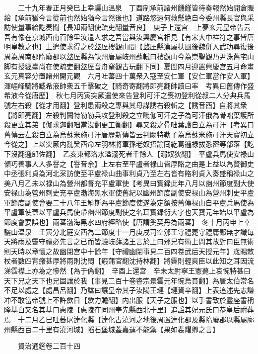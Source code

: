 　　二十九年春正月癸巳上幸驪山温泉　丁酉制承前諸州饑饉皆待奏報然始開倉賑給【承前猶今言從前也然始猶今言然後也】道路悠遠何救懸絶自今委州縣長官與采訪使量事給訖奏聞【長知兩翻使疏吏翻量音良】　庚子上還宫　上夢玄元皇帝告云吾有像在京城西南百餘里汝遣人求之吾當與汝興慶宫相見【有宋大中祥符之事皆唐明皇教之也】上遣使求得之於盩厔樓觀山間【盩厔縣漢屬扶風後魏併入武功尋復後周為周南郡隋廢郡以盩厔縣為缺州唐屬岐州蘇軾曰樓觀山今為崇聖觀乃尹洙舊宅山脚有授經臺尚在使疏吏翻盩厔音舟窒觀古玩翻下同】夏閏四月迎置興慶宫五月命畫玄元真容分置諸州開元觀　六月吐蕃四十萬衆入寇至安仁軍【安仁軍當作安人軍】渾崕峰騎將臧希液帥衆五千擊破之【騎奇寄翻將即亮翻帥讀曰率　考異曰舊傳作盛希液今從唐歷】　秋七月丙寅突厥遣使來告登利可汗之喪初登利從叔二人分典兵馬號左右殺【從才用翻】登利患兩殺之專與其母謀誘右殺斬之【誘音酉】自將其衆【將即亮翻】左殺判闕特勒勒兵攻登利殺之立毗伽可汗之子為可汗俄為骨咄葉護所殺更立其弟【伽求迦翻咄當沒翻更工衡翻】尋又殺之骨咄葉護自立為可汗【考異曰舊傳云左殺自立為烏蘇米施可汗唐歷新傳皆云判闕特勒子為烏蘇米施可汗天寶初立今從之】上以突厥内亂癸酉命左羽林將軍孫老奴招諭囘紇葛邏禄拔悉密等部落【訖下沒翻邏郎佐翻】　乙亥東都洛水溢溺死者千餘人【溺奴狄翻】　平盧兵馬使安禄山傾巧善事人人多譽之【譽音余】上左右至平盧者禄山皆厚賂之由是上益以為賢御史中丞張利貞為河北采訪使至平盧禄山曲事利貞乃至左右皆有賂利貞入奏盛稱禄山之美八月乙未以禄山為營州都督充平盧軍使【考異曰實録此年八月以幽州節度副大使安禄山為營州刺史充平盧渤海黑水軍使舊紀以幽州節度副使安禄山為營州刺史平盧軍節度副使會要二十八年王斛斯為平盧節度使遂為定額按舊傳禄山自平盧兵馬使為平盧軍使蓋以平盧兵馬使帶幽州節度副使之名耳實録衍大字也天寶元年始以平盧為節度會要誤也】兩蕃渤海黑水四府經略使【唐謂奚契丹為兩蕃】　冬十月丙申上幸驪山温泉　壬寅分北庭安西為二節度十一月庚戌司空邠王守禮薨守禮庸鄙無才識每天將雨及霽守禮必先言之已而皆驗岐薛諸王言於上曰邠兄有術上問其故對曰臣無術則天時以章懷之故幽閉宫中十餘年【守禮幽閉事見二百四卷武后天授元年】歲賜敕杖者數四背瘢甚厚將雨則沈悶【瘢蒲官翻沈持林翻】將霽則輕爽臣以此知之耳因流涕霑襟上亦為之慘然【為于偽翻】　辛酉上還宫　辛未太尉寧王憲薨上哀惋特甚曰天下兄之天下也兄固讓於我【事見二百十卷睿宗景雲元年惋烏貫翻】為唐太伯常名不足以處之【處昌呂翻】乃諡曰讓皇帝其子汝陽王璉【璉資辛翻】上表追述先志謙冲不敢當帝號上不許歛日【歛力贍翻】内出服【天子之服也】以手書致於靈座書稱隆基白又名其基曰惠陵【惠陵在同州奉先縣西北十里】追諡其妃元氏曰恭皇后祔葬焉　十二月乙巳吐蕃屠逹化縣【逹化古澆河之地後周置逹化郡及縣隋廢郡以縣屬廓州縣西百二十里有澆河城】䧟石堡城蓋嘉運不能禦【果如裴耀卿之言】

　　資治通鑑卷二百十四


    


